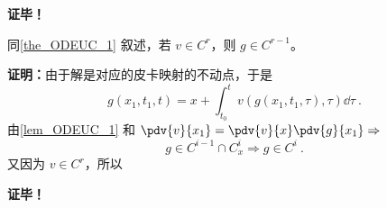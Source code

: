 \textbf{证毕！}
\begin{theorem}{}
同\autoref{the_ODEUC_1} 叙述，若 $v\in C^r $，则 $g\in C^{r-1}$。
\end{theorem}
\textbf{证明：}由于解是对应的皮卡映射的不动点，于是
\begin{equation}
g(x_1,t_1,t)=x+\int_{t_0}^tv(g(x_1,t_1,\tau),\tau)\dd\tau~.
\end{equation}
由\autoref{lem_ODEUC_1} 和 $\pdv{v}{x_1}=\pdv{v}{x}\pdv{g}{x_1}\Rightarrow $
\begin{equation}
g\in C^{i-1}\cap C_x^{i}\Rightarrow g\in C^i~.
\end{equation}
又因为 $v\in C^r$，所以


\textbf{证毕！}